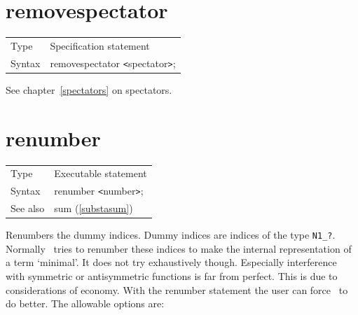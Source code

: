 
\section{removespectator}
\label{substaremovespectator}

\noindent \begin{tabular}{ll}
Type & Specification statement\\
Syntax & removespectator {\tt<}spectator{\tt>};
\end{tabular} \vspace{4mm}

\noindent See chapter~\ref{spectators} on spectators.
\vspace{10mm}


\section{renumber}
\label{substarenumber}

\noindent \begin{tabular}{ll}
Type & Executable statement\\
Syntax & renumber {\tt<}number{\tt>};
\\ See also & sum (\ref{substasum})
\end{tabular}\vspace{4mm}

\noindent Renumbers the dummy 
indices. Dummy indices are indices of the type 
\verb:N1_?:. Normally \FORM\ tries to renumber these indices to make the 
internal representation of a term `minimal'. It does not try exhaustively 
though. Especially interference with symmetric or antisymmetric functions 
is far from perfect. This is due to considerations of economy. With the 
renumber statement the user can force \FORM\ to do better. The allowable 
options are:


\vspace{10mm}

